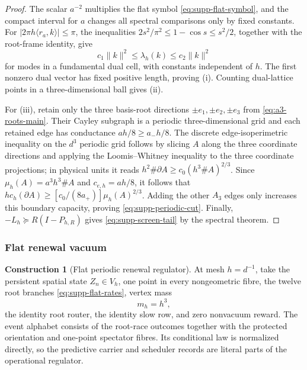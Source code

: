 \documentclass[11pt]{article}
\numberwithin{equation}{section}
\theoremstyle{definition}
\newtheorem{construction}[construction]{Construction}
\theoremstyle{remark}
\newcommand{\norm}[1]{\lVert#1\rVert}
\newcommand{\abs}[1]{\lvert#1\rvert}
\begin{document}
\begin{proof}
The scalar $a^{-2}$ multiplies the flat symbol
\eqref{eq:supp-flat-symbol}, and the compact interval for $a$ changes all
spectral comparisons only by fixed constants.  For $\abs{2\pi h\langle
r_a,k\rangle}\le\pi$, the inequalities
$2s^2/\pi^2\le1-\cos s\le s^2/2$, together with the root-frame identity, give
\begin{equation}
 c_1\norm{k}^2\le\lambda_h(k)\le c_2\norm{k}^2
 \label{eq:supp-symbol-comparison}
\end{equation}
for modes in a fundamental dual cell, with constants independent of $h$.
The first nonzero dual vector has fixed positive length, proving (i).
Counting dual-lattice points in a three-dimensional ball gives (ii).

For (iii), retain only the three basis-root directions
$\pm e_1,\pm e_2,\pm e_3$ from \eqref{eq:a3-roots-main}.  Their Cayley
subgraph is a periodic three-dimensional grid and each retained edge has
conductance $ah/8\ge a_-h/8$.  The discrete edge-isoperimetric inequality on
the $d^3$ periodic grid follows by slicing $A$ along the three coordinate
directions and applying the Loomis--Whitney inequality to the three coordinate
projections; in physical units it reads
$h^2\#\partial A\ge c_0(h^3\#A)^{2/3}$.  Since
$\mu_h(A)=a^3h^3\#A$ and $c_{e,h}=ah/8$, it follows that
$h c_h(\partial A)\ge[c_0/(8a_+)]\mu_h(A)^{2/3}$.
Adding the other $A_3$ edges only increases this boundary capacity, proving
\eqref{eq:supp-periodic-cut}.  Finally,
$-L_h\succeq R(I-P_{h,R})$ gives
\eqref{eq:supp-screen-tail} by the spectral theorem.
\end{proof}

\subsubsection{Flat renewal vacuum}

\begin{construction}[Flat periodic renewal regulator]
\label{con:supp-flat-regulator}
At mesh $h=d^{-1}$, take the persistent spatial state $Z_n\in V_h$, one point
in every nongeometric fibre, the twelve root branches
\eqref{eq:supp-flat-rates}, vertex mass
\begin{equation}
 m_h=h^3,
 \label{eq:supp-flat-mass}
\end{equation}
the identity root router, the identity slow row, and zero nonvacuum reward.
The event alphabet consists of the root-race outcomes together with the
protected orientation and one-point spectator fibres.  Its conditional law is
normalized directly, so the predictive carrier and scheduler records are
literal parts of the operational regulator.
\end{construction}
\end{document}
